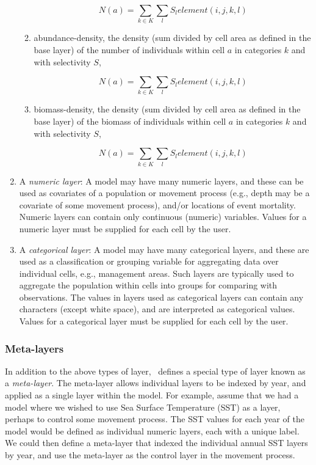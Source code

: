 \begin{enumerate}
\begin{enumerate}
\[
N\left( a \right) = \sum\limits_{k \in K} {\sum\limits_l {S_l element\left( {i,j,k,l} \right)} } 
\]

\item abundance-density, the density (sum divided by cell area as defined in the base layer) of the number of individuals within cell $a$ in categories $k$ and with selectivity $S$,

\[
N\left( a \right) = \sum\limits_{k \in K} {\sum\limits_l {S_l element\left( {i,j,k,l} \right)} } 
\]

\item biomass-density, the density (sum divided by cell area as defined in the base layer) of the biomass of individuals within cell $a$ in categories $k$ and with selectivity $S$,

\[
N\left( a \right) = \sum\limits_{k \in K} {\sum\limits_l {S_l element\left( {i,j,k,l} \right)} } 
\]

\end{enumerate}

\item A \emph{numeric layer}: A model may have many numeric layers, and these can be used as covariates of a population or movement process (e.g., depth may be a covariate of some movement process), and/or locations of event mortality. Numeric layers can contain only continuous (numeric) variables. Values for a numeric layer must be supplied for each cell by the user.

\item A \emph{categorical layer}: A model may have many categorical layers, and these are used as a classification or grouping variable for aggregating data over individual cells, e.g., management areas. Such layers are typically used to aggregate the population within cells into groups for comparing with observations. The values in layers used as categorical layers can contain any characters (except white space), and are interpreted as categorical values. Values for a categorical layer must be supplied for each cell by the user.

\end{enumerate}

\subsubsection{Meta-layers\label{meta-layers}}

In addition to the above types of layer, \SPM\ defines a special type of layer known as a \emph{meta-layer}. The meta-layer allows individual layers to be indexed by year, and applied as a single layer within the model. For example, assume that we had a model where we wished to use Sea Surface Temperature (SST) as a layer, perhaps to control some movement process. The SST values for each year of the model would be defined as individual numeric layers, each with a unique label. We could then define a meta-layer that indexed the individual annual SST layers by year, and use the meta-layer as the control layer in the movement process. 

